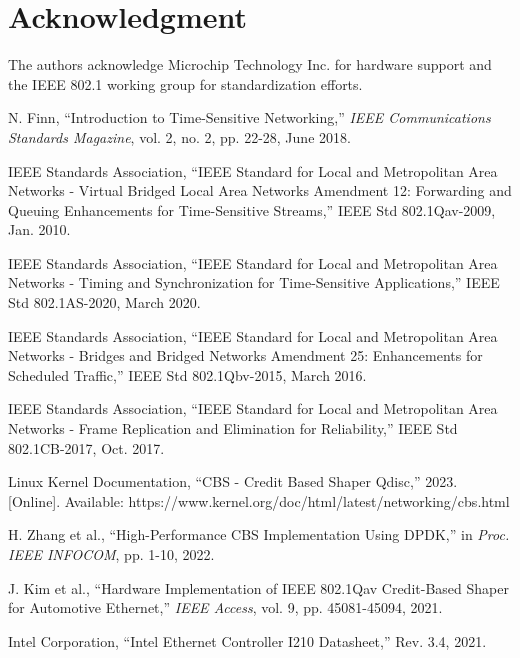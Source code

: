 \documentclass[10pt, journal, compsoc]{IEEEtran}
\begin{document}
\section*{Acknowledgment}

The authors acknowledge Microchip Technology Inc. for hardware support and the IEEE 802.1 working group for standardization efforts.

\begin{thebibliography}{99}

N. Finn, ``Introduction to Time-Sensitive Networking,'' \textit{IEEE Communications Standards Magazine}, vol. 2, no. 2, pp. 22-28, June 2018.

IEEE Standards Association, ``IEEE Standard for Local and Metropolitan Area Networks - Virtual Bridged Local Area Networks Amendment 12: Forwarding and Queuing Enhancements for Time-Sensitive Streams,'' IEEE Std 802.1Qav-2009, Jan. 2010.

IEEE Standards Association, ``IEEE Standard for Local and Metropolitan Area Networks - Timing and Synchronization for Time-Sensitive Applications,'' IEEE Std 802.1AS-2020, March 2020.

IEEE Standards Association, ``IEEE Standard for Local and Metropolitan Area Networks - Bridges and Bridged Networks Amendment 25: Enhancements for Scheduled Traffic,'' IEEE Std 802.1Qbv-2015, March 2016.

IEEE Standards Association, ``IEEE Standard for Local and Metropolitan Area Networks - Frame Replication and Elimination for Reliability,'' IEEE Std 802.1CB-2017, Oct. 2017.

Linux Kernel Documentation, ``CBS - Credit Based Shaper Qdisc,'' 2023. [Online]. Available: https://www.kernel.org/doc/html/latest/networking/cbs.html

H. Zhang et al., ``High-Performance CBS Implementation Using DPDK,'' in \textit{Proc. IEEE INFOCOM}, pp. 1-10, 2022.

J. Kim et al., ``Hardware Implementation of IEEE 802.1Qav Credit-Based Shaper for Automotive Ethernet,'' \textit{IEEE Access}, vol. 9, pp. 45081-45094, 2021.

Intel Corporation, ``Intel Ethernet Controller I210 Datasheet,'' Rev. 3.4, 2021.

\end{thebibliography}
\end{document}
